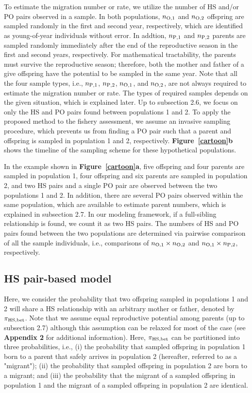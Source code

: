 \documentclass[12pt, English]{article}
\begin{document}
\begin{spacing}{1.9}
To estimate the migration number or rate, we utilize the number of HS and/or PO pairs observed in a sample. In both populations, $n_{\rm O, 1}$ and $n_{\rm O, 2}$ offspring are sampled randomly in the first and second year, respectively, which are identified as young-of-year individuals without error. In addtion, $n_{\rm P, 1}$ and $n_{\rm P, 2}$ parents are sampled randomly immediately after the end of the reproductive season in the first and second years, respectively. For mathematical tractability, the parents must survive the reproductive season; therefore, both the mother and father of a give offspring have the potential to be sampled in the same year. Note that all the four sample types, i.e., $n_{\rm P, 1}$, $n_{\rm P, 2}$, $n_{\rm O, 1}$, and $n_{\rm O, 2}$, are not always required to estimate the migration number or rate. The types of required samples depends on the given situation, which is explained later. Up to subsection 2.6, we focus on only the HS and PO pairs found between populations 1 and 2. To apply the proposed method to the fishery assessment, we assume an invasive sampling procedure, which prevents us from finding a PO pair such that a parent and offspring is sampled in population 1 and 2, respectively. {\bf Figure~\ref{cartoon}b} shows the timeline of the sampling scheme for these hypothetical populations. 

In the example shown in {\bf Figure~\ref{cartoon}a}, five offspring and four parents are sampled in population 1, four offspring and six parents are sampled in population 2, and two HS pairs and a single PO pair are observed between the two populations 1 and 2. In addition, there are several PO pairs observed within the same population, which are available to estimate parent numbers, which is explained in subsection 2.7. In our modeling framework, if a full-sibling relationship is found, we count it as two HS pairs. The numbers of HS and PO pairs found between the two populations are determined via pairwise comparison of all the sample individuals, i.e., comparisons of $n_{\rm O,1}\times n_{\rm O,2}$ and $n_{\rm O,1}\times n_{\rm P,2}$, respectively. 

\subsection{HS pair-based model}

Here, we consider the probability that two offspring sampled in populations 1 and 2 will share a HS relationship with an arbitrary mother or father, denoted by $\pi_{\rm HS, bet}$. Note that we assume equal reproductive potential among parents (up to subsection 2.7) although this assumption can be relaxed for most of the case (see {\bf Appendix 2} for additional information). Here, $\pi_{\rm HS, bet}$ can be partitioned into three probabilities, i.e., (i) the probability that sampled offspring in population 1 born to a parent that safely arrives in population 2 (hereafter, referred to as a "migrant"); (ii) the probability that sampled offspring in population 2 are born to a migrant; and (iii) the probability that the migrant of a sampled offspring in population 1 and the migrant of a sampled offspring in population 2 are identical. 


\end{spacing}
\end{document}
